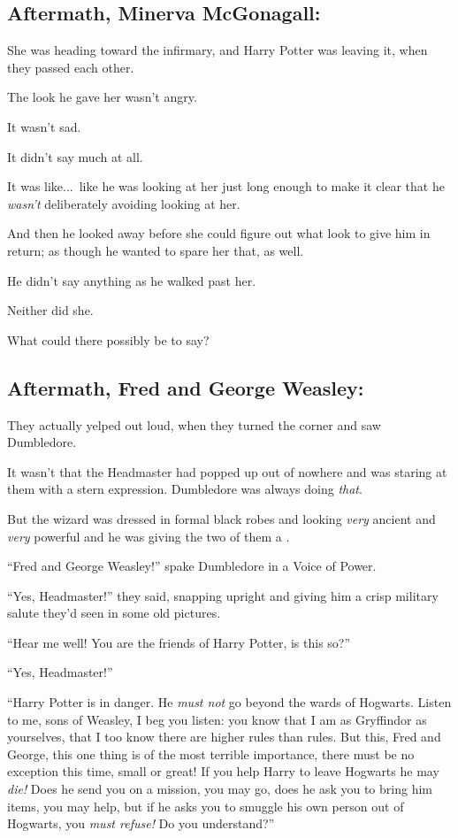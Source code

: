 \subsection{Aftermath, Minerva McGonagall:}

\noindent{}She was heading toward the infirmary, and Harry Potter was leaving it, when they passed each other.

The look he gave her wasn’t angry.

It wasn’t sad.

It didn’t say much at all.

It was like...\ like he was looking at her just long enough to make it clear that he \emph{wasn’t} deliberately avoiding looking at her.

And then he looked away before she could figure out what look to give him in return; as though he wanted to spare her that, as well.

He didn’t say anything as he walked past her.

Neither did she.

What could there possibly be to say?
\replacement{\sbreak}{}

\subsection{Aftermath, Fred and George Weasley:}

\noindent{}They actually yelped out loud, when they turned the corner and saw Dumbledore.

It wasn’t that the Headmaster had popped up out of nowhere and was staring at them with a stern expression. Dumbledore was always doing \emph{that}.

But the wizard was dressed in formal black robes and looking \emph{very} ancient and \emph{very} powerful and he was giving the two of them a .

“Fred and George Weasley!” spake Dumbledore in a Voice of Power.

“Yes, Headmaster!” they said, snapping upright and giving him a crisp military salute they’d seen in some old pictures.

“Hear me well! You are the friends of Harry Potter, is this so?”

“Yes, Headmaster!”

“Harry Potter is in danger. He \emph{must not} go beyond the wards of Hogwarts. Listen to me, sons of Weasley, I beg you listen: you know that I am as Gryffindor as yourselves, that I too know there are higher rules than rules. But this, Fred and George, this one thing is of the most terrible importance, there must be no exception this time, small or great! If you help Harry to leave Hogwarts he may \emph{die!} Does he send you on a mission, you may go, does he ask you to bring him items, you may help, but if he asks you to smuggle his own person out of Hogwarts, you \emph{must refuse!} Do you understand?”

